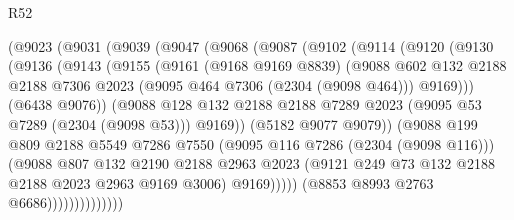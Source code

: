 \begin{lexlean}{R52}
\begin{coremodule}
                  (@9023
                    (@9031
                      (@9039
                        (@9047
                          (@9068
                            (@9087
                              (@9102
                                (@9114
                                  (@9120
                                    (@9130
                                      (@9136
                                        (@9143
                                          (@9155
                                            (@9161
                                              (@9168 @9169 @8839)
                                              (@9088
                                                @602
                                                @132
                                                @2188
                                                @2188
                                                @7306
                                                @2023
                                                (@9095 @464 @7306 (@2304 (@9098 @464)))
                                                @9169)))
                                          (@6438 @9076))
                                        (@9088
                                          @128
                                          @132
                                          @2188
                                          @2188
                                          @7289
                                          @2023
                                          (@9095 @53 @7289 (@2304 (@9098 @53)))
                                          @9169))
                                      (@5182 @9077 @9079))
                                    (@9088
                                      @199
                                      @809
                                      @2188
                                      @5549
                                      @7286
                                      @7550
                                      (@9095 @116 @7286 (@2304 (@9098 @116)))
                                      (@9088
                                        @807
                                        @132
                                        @2190
                                        @2188
                                        @2963
                                        @2023
                                        (@9121 @249 @73 @132 @2188 @2188 @2023 @2963 @9169 @3006)
                                        @9169)))))
                              (@8853 @8993 @2763 @6686))))))))))))))

\end{coremodule}
\end{lexlean}

